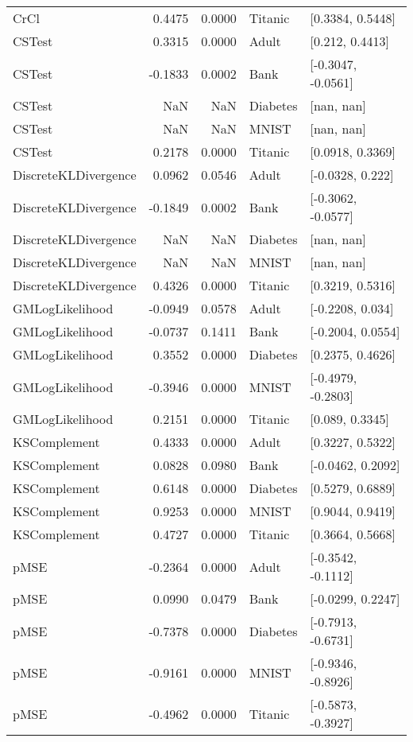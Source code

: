\begin{tabular}{lrrll}
CrCl                  &       0.4475 &   0.0000 &   Titanic &    [0.3384, 0.5448] \\
CSTest                &       0.3315 &   0.0000 &     Adult &     [0.212, 0.4413] \\
CSTest                &      -0.1833 &   0.0002 &      Bank &  [-0.3047, -0.0561] \\
CSTest                &          NaN &      NaN &  Diabetes &          [nan, nan] \\
CSTest                &          NaN &      NaN &     MNIST &          [nan, nan] \\
CSTest                &       0.2178 &   0.0000 &   Titanic &    [0.0918, 0.3369] \\
DiscreteKLDivergence  &       0.0962 &   0.0546 &     Adult &    [-0.0328, 0.222] \\
DiscreteKLDivergence  &      -0.1849 &   0.0002 &      Bank &  [-0.3062, -0.0577] \\
DiscreteKLDivergence  &          NaN &      NaN &  Diabetes &          [nan, nan] \\
DiscreteKLDivergence  &          NaN &      NaN &     MNIST &          [nan, nan] \\
DiscreteKLDivergence  &       0.4326 &   0.0000 &   Titanic &    [0.3219, 0.5316] \\
GMLogLikelihood       &      -0.0949 &   0.0578 &     Adult &    [-0.2208, 0.034] \\
GMLogLikelihood       &      -0.0737 &   0.1411 &      Bank &   [-0.2004, 0.0554] \\
GMLogLikelihood       &       0.3552 &   0.0000 &  Diabetes &    [0.2375, 0.4626] \\
GMLogLikelihood       &      -0.3946 &   0.0000 &     MNIST &  [-0.4979, -0.2803] \\
GMLogLikelihood       &       0.2151 &   0.0000 &   Titanic &     [0.089, 0.3345] \\
KSComplement          &       0.4333 &   0.0000 &     Adult &    [0.3227, 0.5322] \\
KSComplement          &       0.0828 &   0.0980 &      Bank &   [-0.0462, 0.2092] \\
KSComplement          &       0.6148 &   0.0000 &  Diabetes &    [0.5279, 0.6889] \\
KSComplement          &       0.9253 &   0.0000 &     MNIST &    [0.9044, 0.9419] \\
KSComplement          &       0.4727 &   0.0000 &   Titanic &    [0.3664, 0.5668] \\
pMSE                  &      -0.2364 &   0.0000 &     Adult &  [-0.3542, -0.1112] \\
pMSE                  &       0.0990 &   0.0479 &      Bank &   [-0.0299, 0.2247] \\
pMSE                  &      -0.7378 &   0.0000 &  Diabetes &  [-0.7913, -0.6731] \\
pMSE                  &      -0.9161 &   0.0000 &     MNIST &  [-0.9346, -0.8926] \\
pMSE                  &      -0.4962 &   0.0000 &   Titanic &  [-0.5873, -0.3927] \\
\bottomrule
\end{tabular}
